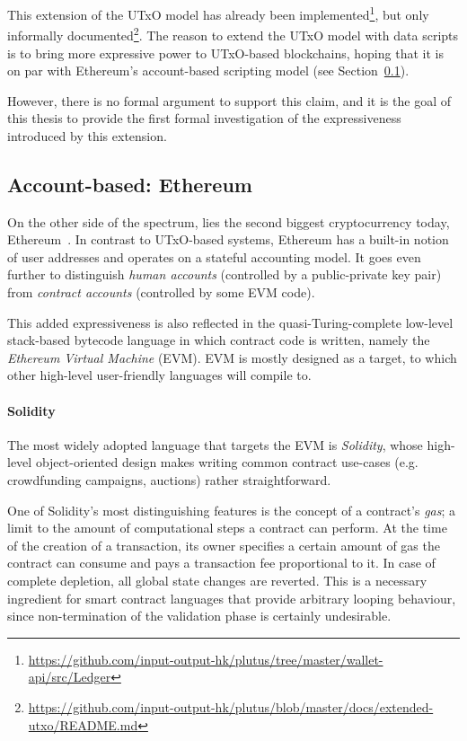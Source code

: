 \documentclass[acmsmall,nonacm=true,screen=true]{acmart}
\newcommand\site[1]{\footnote{\url{#1}}}
\begin{document}
This extension of the UTxO model has already been
implemented\site{https://github.com/input-output-hk/plutus/tree/master/wallet-api/src/Ledger}, but
only informally documented\site{https://github.com/input-output-hk/plutus/blob/master/docs/extended-utxo/README.md}.
The reason to extend the UTxO model with data scripts is to bring more expressive power to UTxO-based blockchains,
hoping that it is on par with Ethereum's account-based scripting model (see Section~\ref{subsec:ethereum}).

However, there is no formal argument to support this claim, and it is the goal of this thesis
to provide the first formal investigation of the expressiveness introduced by this extension.

\subsection{Account-based: Ethereum} \label{subsec:ethereum}
On the other side of the spectrum, lies the second biggest cryptocurrency today, Ethereum~\cite{ethereum}.
In contrast to UTxO-based systems, Ethereum has a built-in notion of user addresses and operates on a
stateful accounting model. It goes even further to distinguish \textit{human accounts}
(controlled by a public-private key pair) from \textit{contract accounts} (controlled by some EVM code).

This added expressiveness is also reflected in the quasi-Turing-complete low-level stack-based bytecode language
in which contract code is written, namely the \textit{Ethereum Virtual Machine} (EVM).
EVM is mostly designed as a target, to which other high-level user-friendly languages will compile to.

\paragraph{Solidity}
The most widely adopted language that targets the EVM is \textit{Solidity},
whose high-level object-oriented design makes writing common contract use-cases (e.g. crowdfunding campaigns, auctions)
rather straightforward.

One of Solidity's most distinguishing features is the concept of a contract's \textit{gas}; a limit to the amount
of computational steps a contract can perform.
At the time of the creation of a transaction, its owner specifies a certain amount of gas the contract can consume and
pays a transaction fee proportional to it. In case of complete depletion, all global state changes are reverted.
This is a necessary ingredient for smart contract languages that provide
arbitrary looping behaviour, since non-termination of the validation phase is certainly undesirable.
\end{document}
